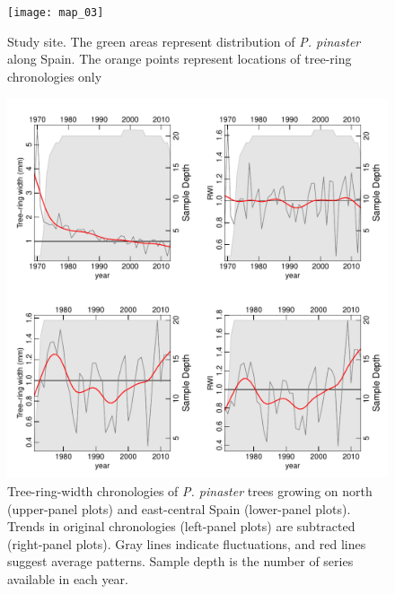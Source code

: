\documentclass[review,authoryear]{elsarticle}
\begin{document}
\clearpage
\begin{figure}\centering
\texttt{[image: map\_03]} 
\caption{Study site. The green areas represent distribution of
  \textit{P. pinaster} along Spain. The orange points represent
  locations of tree-ring chronologies only}
\label{fig:map_03} 
\end{figure}

\clearpage
\begin{figure}\centering
\includegraphics[scale=0.7,trim=20mm 0mm 20mm 0mm]{RWIs} 
\caption{Tree-ring-width chronologies of \textit{P. pinaster} trees
  growing on north (upper-panel plots) and east-central Spain
  (lower-panel plots). Trends in original chronologies (left-panel
  plots) are subtracted (right-panel plots). Gray lines indicate
  fluctuations, and red lines suggest average patterns. Sample depth
  is the number of series available in each year.}
\label{fig:RWIs} 
\end{figure}
\end{document}
